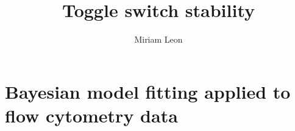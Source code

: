 \documentclass[]{chapter_only}
\title{Toggle switch stability}
\author{Miriam Leon}
\begin{document}

\tableofcontents*
{}


\mainmatter*
\chapter{Bayesian model fitting applied to flow cytometry data}



\printbibliography
\end{document}
